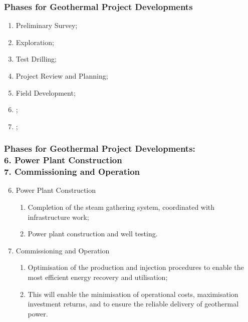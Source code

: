 \documentclass[10pt,compress,unknownkeysallowed]{beamer}
\begin{document}
\begin{frame}
 \frametitle{Phases for Geothermal Project Developments} 
    \begin{enumerate}[1.]
       \item <1-> Preliminary Survey;
       \item <1-> Exploration; 
       \item <1-> Test Drilling;
       \item <1-> Project Review and Planning;
       \item <1-> Field Development; 
       \item <2-> ;
       \item <2-> ;
    \end{enumerate}
\end{frame}


\begin{frame}
 \frametitle{Phases for Geothermal Project Developments: \\ 6. Power Plant Construction \\ 7. Commissioning and Operation }
    \begin{enumerate}[1]\setcounter{enumi}{5}
       \item <1-> Power Plant Construction
         \begin{enumerate}[{6.}1]
           \item<1-> Completion of the steam gathering system, coordinated with infrastructure work;
           \item<1-> Power plant construction and well testing.
         \end{enumerate}
       \item <2-> Commissioning and Operation
         \begin{enumerate}[{7.}1]
           \item<2-> Optimisation of the production and injection procedures to enable the most efficient energy recovery and utilisation;
           \item<2-> This will enable the minimisation of operational costs, maximisation investment returns, and to ensure the reliable delivery of geothermal power.
         \end{enumerate}
    \end{enumerate}
\end{frame}
 
\end{document}
